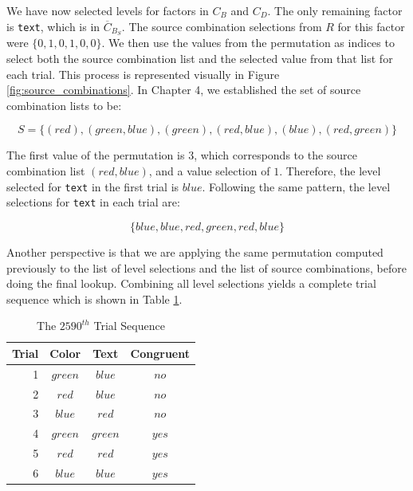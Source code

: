 We have now selected levels for factors in $C_B$ and $C_D$. The only remaining factor is \texttt{text}, which is in $\overline{C}_{B_S}$. The source combination selections from $R$ for this factor were $\{0, 1, 0, 1, 0, 0\}$. We then use the values from the permutation as indices to select both the source combination list and the selected value from that list for each trial. This process is represented visually in Figure \ref{fig:source_combinations}. In Chapter 4, we established the set of source combination lists to be:

\[
S = \{(red), (green, blue), (green), (red, blue), (blue), (red, green)\}
\]

The first value of the permutation is $3$, which corresponds to the source combination list $(red, blue)$, and a value selection of $1$. Therefore, the level selected for \texttt{text} in the first trial is $blue$. Following the same pattern, the level selections for \texttt{text} in each trial are:

\[
  \{blue, blue, red, green, red, blue\}
\]

Another perspective is that we are applying the same permutation computed previously to the list of level selections and the list of source combinations, before doing the final lookup. Combining all level selections yields a complete trial sequence which is shown in Table \ref{tab:example_trial_sequence}.

\begin{table}[b]
  \centering
  \caption{The $2590^{th}$ Trial Sequence}
\begin{tabular}{|r|c|c|c|}
\hline
\multicolumn{1}{c}{Trial} & Color   & Text    & Congruent \\ \hline
1                         & $green$ & $blue$  & $no$      \\ \hline
2                         & $red$   & $blue$  & $no$      \\ \hline
3                         & $blue$  & $red$   & $no$      \\ \hline
4                         & $green$ & $green$ & $yes$     \\ \hline
5                         & $red$   & $red$   & $yes$     \\ \hline
6                         & $blue$  & $blue$  & $yes$     \\ \hline
\end{tabular}
\label{tab:example_trial_sequence}
\end{table}


